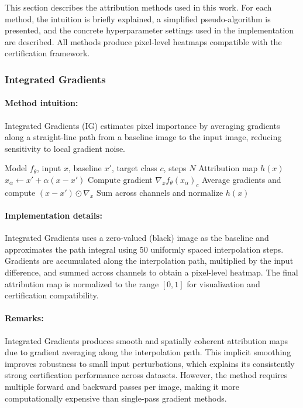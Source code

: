 \documentclass[11pt]{article}
\begin{document}
This section describes the attribution methods used in this work. For each method, the intuition is briefly explained, a simplified pseudo-algorithm is presented, and the concrete hyperparameter settings used in the implementation are described. All methods produce pixel-level heatmaps compatible with the certification framework.

\subsubsection{Integrated Gradients}

\paragraph{Method intuition:}
Integrated Gradients (IG) estimates pixel importance by averaging gradients along a straight-line path from a baseline image to the input image, reducing sensitivity to local gradient noise.

\begin{algorithm}[H]
\caption{Integrated Gradients (IG)}
\label{alg:ig}
\begin{algorithmic}[1]
\REQUIRE Model $f_\theta$, input $x$, baseline $x'$, target class $c$, steps $N$
\ENSURE Attribution map $h(x)$
    \STATE $x_\alpha \leftarrow x' + \alpha (x - x')$
    \STATE Compute gradient $\nabla_x f_\theta(x_\alpha)_c$
\ENDFOR
\STATE Average gradients and compute $(x - x') \odot \nabla_x$
\STATE Sum across channels and normalize
\RETURN $h(x)$
\end{algorithmic}
\end{algorithm}

\paragraph{Implementation details:}
Integrated Gradients uses a zero-valued (black) image as the baseline and approximates the path integral using 50 uniformly spaced interpolation steps. Gradients are accumulated along the interpolation path, multiplied by the input difference, and summed across channels to obtain a pixel-level heatmap. The final attribution map is normalized to the range $[0,1]$ for visualization and certification compatibility.

\paragraph{Remarks:}
Integrated Gradients produces smooth and spatially coherent attribution maps due to gradient averaging along the interpolation path. This implicit smoothing improves robustness to small input perturbations, which explains its consistently strong certification performance across datasets. However, the method requires multiple forward and backward passes per image, making it more computationally expensive than single-pass gradient methods.
\end{document}

